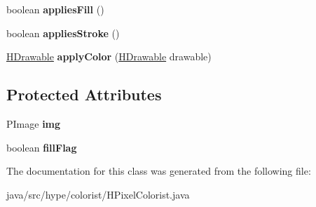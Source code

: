 \begin{DoxyCompactItemize}
\item 
\hypertarget{classhype_1_1colorist_1_1_h_pixel_colorist_afe98f142c8f7cb50fcabb699439e3689}{boolean {\bfseries applies\-Fill} ()}\label{classhype_1_1colorist_1_1_h_pixel_colorist_afe98f142c8f7cb50fcabb699439e3689}

\item 
\hypertarget{classhype_1_1colorist_1_1_h_pixel_colorist_abf0844521b1d35214690d8dfd821a246}{boolean {\bfseries applies\-Stroke} ()}\label{classhype_1_1colorist_1_1_h_pixel_colorist_abf0844521b1d35214690d8dfd821a246}

\item 
\hypertarget{classhype_1_1colorist_1_1_h_pixel_colorist_a2184f6eb74d52cf9d56bae51785f4958}{\hyperlink{classhype_1_1drawable_1_1_h_drawable}{H\-Drawable} {\bfseries apply\-Color} (\hyperlink{classhype_1_1drawable_1_1_h_drawable}{H\-Drawable} drawable)}\label{classhype_1_1colorist_1_1_h_pixel_colorist_a2184f6eb74d52cf9d56bae51785f4958}

\end{DoxyCompactItemize}
\subsection*{Protected Attributes}
\begin{DoxyCompactItemize}
\item 
\hypertarget{classhype_1_1colorist_1_1_h_pixel_colorist_a700427af96c00907f5b583f019b7d6af}{P\-Image {\bfseries img}}\label{classhype_1_1colorist_1_1_h_pixel_colorist_a700427af96c00907f5b583f019b7d6af}

\item 
\hypertarget{classhype_1_1colorist_1_1_h_pixel_colorist_a761a58901f795cdd1191f8a5ce21d2b9}{boolean {\bfseries fill\-Flag}}\label{classhype_1_1colorist_1_1_h_pixel_colorist_a761a58901f795cdd1191f8a5ce21d2b9}

\end{DoxyCompactItemize}


The documentation for this class was generated from the following file\-:\begin{DoxyCompactItemize}
\item 
java/src/hype/colorist/H\-Pixel\-Colorist.\-java\end{DoxyCompactItemize}
